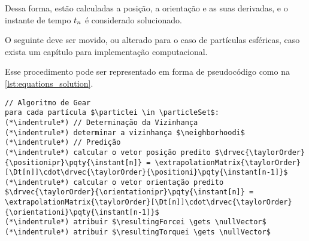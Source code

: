 Dessa forma, estão calculadas a posição, a orientação e as suas derivadas, e o instante de tempo \(\instant[n]\) é considerado solucionado.

\alert{O seguinte deve ser movido, ou alterado para o caso de partículas esféricas, caso exista um capítulo para implementação computacional.}

Esse procedimento pode ser representado em forma de pseudocódigo como na \cref{lst:equations_solution}.
\begin{lstlisting}[float, floatplacement=h, language=pseudocode, label=lst:equations_solution, caption=Pseudocódigo para a solução das equações de movimento por meio do algoritmo de Gear.]
// Algoritmo de Gear
para cada partícula $\particlei \in \particleSet$:
(*\indentrule*)	// Determinação da Vizinhança
(*\indentrule*)	determinar a vizinhança $\neighborhoodi$
(*\indentrule*)	// Predição
(*\indentrule*)	calcular o vetor posição predito $\drvec{\taylorOrder}{\positionipr}\pqty{\instant[n]} = \extrapolationMatrix{\taylorOrder}[\Dt[n]]\cdot\drvec{\taylorOrder}{\positioni}\pqty{\instant[n-1]}$
(*\indentrule*)	calcular o vetor orientação predito $\drvec{\taylorOrder}{\orientationipr}\pqty{\instant[n]} = \extrapolationMatrix{\taylorOrder}[\Dt[n]]\cdot\drvec{\taylorOrder}{\orientationi}\pqty{\instant[n-1]}$
(*\indentrule*)	atribuir $\resultingForcei \gets \nullVector$
(*\indentrule*)	atribuir $\resultingTorquei \gets \nullVector$


\end{lstlisting}
